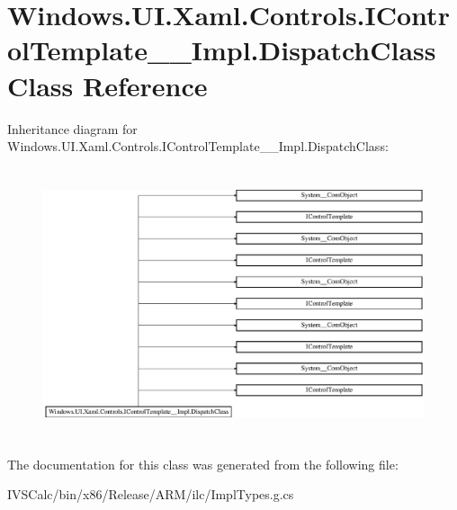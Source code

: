 \hypertarget{class_windows_1_1_u_i_1_1_xaml_1_1_controls_1_1_i_control_template_____impl_1_1_dispatch_class}{}\section{Windows.\+U\+I.\+Xaml.\+Controls.\+I\+Control\+Template\+\_\+\+\_\+\+Impl.\+Dispatch\+Class Class Reference}
\label{class_windows_1_1_u_i_1_1_xaml_1_1_controls_1_1_i_control_template_____impl_1_1_dispatch_class}
Inheritance diagram for Windows.\+U\+I.\+Xaml.\+Controls.\+I\+Control\+Template\+\_\+\+\_\+\+Impl.\+Dispatch\+Class\+:\begin{figure}[H]
\begin{center}
\leavevmode
\includegraphics[height=7.979275cm]{class_windows_1_1_u_i_1_1_xaml_1_1_controls_1_1_i_control_template_____impl_1_1_dispatch_class}
\end{center}
\end{figure}


The documentation for this class was generated from the following file\+:\begin{DoxyCompactItemize}
\item 
I\+V\+S\+Calc/bin/x86/\+Release/\+A\+R\+M/ilc/Impl\+Types.\+g.\+cs\end{DoxyCompactItemize}
